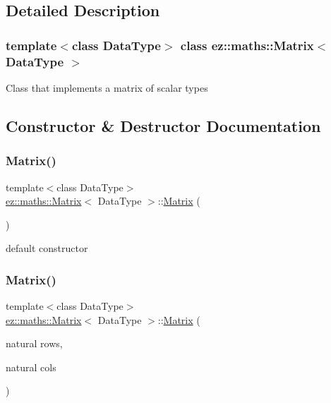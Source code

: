 \subsection{Detailed Description}
\subsubsection*{template$<$class Data\+Type$>$\newline
class ez\+::maths\+::\+Matrix$<$ Data\+Type $>$}

Class that implements a matrix of scalar types 

\subsection{Constructor \& Destructor Documentation}
\mbox{\label{classez_1_1maths_1_1Matrix_ab1ee41b4f342b94006853dc7213ab179}} 
\subsubsection{\texorpdfstring{Matrix()}{Matrix()}\hspace{0.1cm}{\footnotesize\ttfamily [1/2]}}
{\footnotesize\ttfamily template$<$class Data\+Type$>$ \\
\hyperlink{classez_1_1maths_1_1Matrix}{ez\+::maths\+::\+Matrix}$<$ Data\+Type $>$\+::\hyperlink{classez_1_1maths_1_1Matrix}{Matrix} (\begin{DoxyParamCaption}{ }\end{DoxyParamCaption})\hspace{0.3cm}{\ttfamily [inline]}}

default constructor \mbox{\label{classez_1_1maths_1_1Matrix_a97b95c8be7fd18cf0beb2789dee19b2a}} 
\subsubsection{\texorpdfstring{Matrix()}{Matrix()}\hspace{0.1cm}{\footnotesize\ttfamily [2/2]}}
{\footnotesize\ttfamily template$<$class Data\+Type$>$ \\
\hyperlink{classez_1_1maths_1_1Matrix}{ez\+::maths\+::\+Matrix}$<$ Data\+Type $>$\+::\hyperlink{classez_1_1maths_1_1Matrix}{Matrix} (\begin{DoxyParamCaption}\item[{natural}]{rows,  }\item[{natural}]{cols }\end{DoxyParamCaption})\hspace{0.3cm}{\ttfamily [inline]}}


